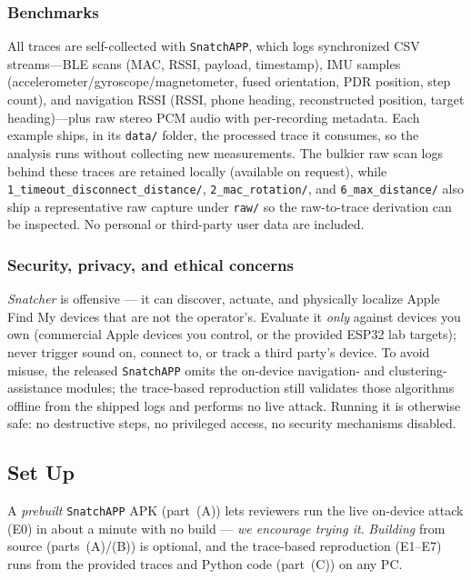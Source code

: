 \documentclass[nonacm,sigconf]{acmart}
\begin{document}
\subsubsection{Benchmarks}
All traces are self-collected with \texttt{SnatchAPP}, which logs synchronized
CSV streams---BLE scans (MAC, RSSI, payload, timestamp), IMU samples
(accelerometer/gyroscope/magnetometer, fused orientation, PDR position, step
count), and navigation RSSI (RSSI, phone heading, reconstructed position, target
heading)---plus raw stereo PCM audio with per-recording metadata. Each example
ships, in its \texttt{data/} folder, the processed trace it consumes, so the
analysis runs without collecting new measurements. The bulkier raw scan logs
behind these traces are retained locally (available on request), while
\texttt{1\_timeout\_disconnect\_distance/}, \texttt{2\_mac\_rotation/}, and
\texttt{6\_max\_distance/} also ship a representative raw capture under
\texttt{raw/} so the raw-to-trace derivation can be inspected. No personal or
third-party user data are included.

\subsubsection{Security, privacy, and ethical concerns}
\textit{Snatcher} is offensive --- it can discover, actuate, and physically
localize Apple Find My devices that are not the operator's. Evaluate it
\emph{only} against devices you own (commercial Apple devices you control, or the
provided ESP32 lab targets); never trigger sound on, connect to, or track a
third party's device. To avoid misuse, the released \texttt{SnatchAPP} omits the
on-device navigation- and clustering-assistance modules; the trace-based
reproduction still validates those algorithms offline from the shipped logs and
performs no live attack. Running it is otherwise safe: no destructive steps, no
privileged access, no security mechanisms disabled.

\subsection{Set Up}
A \emph{prebuilt} \texttt{SnatchAPP} APK (part~(A)) lets reviewers run the live
on-device attack (E0) in about a minute with no build --- \emph{we encourage
trying it}. \emph{Building} from source (parts~(A)/(B)) is optional, and the
trace-based reproduction (E1--E7) runs from the provided traces and Python code
(part~(C)) on any PC.
\end{document}
